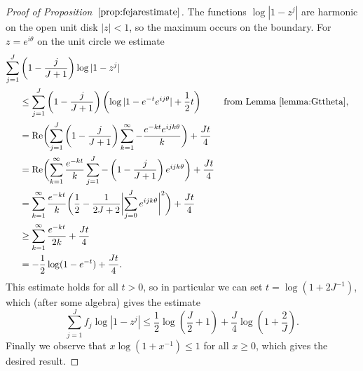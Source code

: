 \documentclass[12pt,reqno]{amsart}
\begin{document}
\begin{proof}[Proof of Proposition~$\ref{prop:fejarestimate}$]
The functions $\log|1-z^j|$ are harmonic on the open unit disk $|z|<1$,
so the maximum occurs on the boundary. For $z=e^{i\theta}$ on the unit
circle we estimate
\begin{align*}
  \sum_{j=1}^J&\left(1-\frac{j}{J+1}\right)\log|1-z^j|\\
  &\le \sum_{j=1}^J \left(1-\frac{j}{J+1}\right) 
                    \left(\log|1-e^{-t}e^{ij\theta}| + \frac12t\right)
   &&\text{from Lemma \ref{lemma:Gttheta},} \\
  &= \Re\biggl(
      \sum_{j=1}^J \left(1-\frac{j}{J+1}\right) 
                       \sum_{k=1}^\infty -\frac{e^{-kt}e^{ijk\theta}}{k} \biggr)
     + \frac{Jt}{4} \\
  &= \Re\biggl(
      \sum_{k=1}^\infty \frac{e^{-kt}}{k}\sum_{j=1}^J 
          -\left(1-\frac{j}{J+1}\right)e^{ijk\theta} \biggr)+ \frac{Jt}{4} \\
  &=       \sum_{k=1}^\infty \frac{e^{-kt}}{k}
           \biggl(\frac12
           -\frac{1}{2J+2}\biggl|\sum_{j=0}^Je^{ijk\theta}\biggr|^2\biggr)
     + \frac{Jt}{4} \hidewidth\\
  &\ge \sum_{k=1}^\infty \frac{e^{-kt}}{2k} + \frac{Jt}{4} \\
  &= -\frac12\log(1-e^{-t}) + \frac{Jt}{4}.
\end{align*}
This estimate holds for all $t>0$, so in particular we can
set $t=\log(1+2J^{-1})$, which (after some algebra) gives the estimate
\[
  \sum_{j=1}^J f_j\log|1-z^j|
  \le \frac12\log\left(\frac{J}{2}+1\right)
      +\frac{J}{4}\log\left(1+\frac{2}{J}\right).
\]
Finally we observe that $x\log(1+x^{-1})\le 1$ for all $x\ge0$, which
gives the desired result.
\end{proof}





\end{document}
